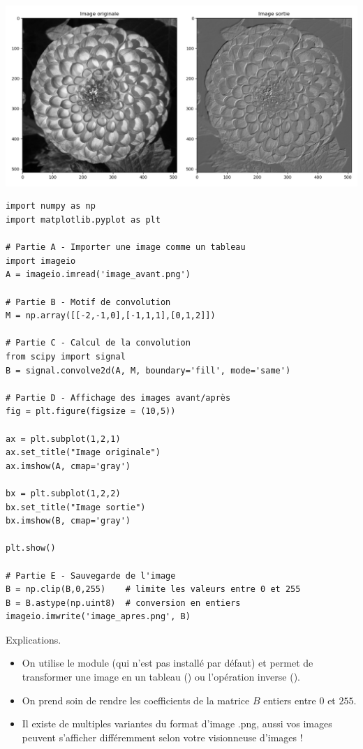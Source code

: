 \documentclass[11pt,class=report,crop=false]{standalone}
\begin{document}
\begin{center}
\includegraphics[scale=\myscale,scale=0.3]{figures/ecran-convolution-1}
\end{center}


\begin{lstlisting}
import numpy as np
import matplotlib.pyplot as plt

# Partie A - Importer une image comme un tableau
import imageio
A = imageio.imread('image_avant.png')

# Partie B - Motif de convolution
M = np.array([[-2,-1,0],[-1,1,1],[0,1,2]])

# Partie C - Calcul de la convolution
from scipy import signal
B = signal.convolve2d(A, M, boundary='fill', mode='same')

# Partie D - Affichage des images avant/après
fig = plt.figure(figsize = (10,5))

ax = plt.subplot(1,2,1)
ax.set_title("Image originale")
ax.imshow(A, cmap='gray')

bx = plt.subplot(1,2,2)
bx.set_title("Image sortie")
bx.imshow(B, cmap='gray')

plt.show()

# Partie E - Sauvegarde de l'image
B = np.clip(B,0,255)    # limite les valeurs entre 0 et 255
B = B.astype(np.uint8)  # conversion en entiers
imageio.imwrite('image_apres.png', B)
\end{lstlisting}

Explications.
\begin{itemize}
  \item On utilise le module  (qui n'est pas installé par défaut) et permet de transformer une image en un tableau \numpy{} () ou l'opération inverse ().
  \item On prend soin de rendre les coefficients de la matrice $B$ entiers entre $0$ et $255$.
  \item Il existe de multiples variantes du format d'image \og{}.png\fg{}, aussi vos images peuvent s'afficher différemment selon votre visionneuse d'images !
\end{itemize}
\end{document}
